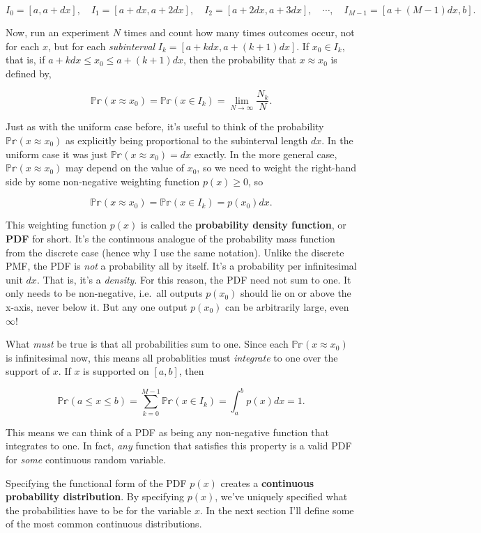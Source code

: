 \documentclass[
  letterpaper,
  DIV=11,
  numbers=noendperiod]{scrreprt}
\begin{document}
\[I_0=[a,a+dx], \quad I_1=[a+dx, a+2dx], \quad I_2=[a+2dx, a+3dx], \quad \cdots, \quad I_{M-1}=[a+(M-1)dx, b].\]

Now, run an experiment \(N\) times and count how many times outcomes
occur, not for each \(x\), but for each \emph{subinterval}
\(I_k=[a+kdx, a+(k+1)dx]\). If \(x_0 \in I_k\), that is, if
\(a+kdx \leq x_0 \leq a+(k+1)dx\), then the probability that
\(x \approx x_0\) is defined by,

\[\mathbb{Pr}(x \approx x_0) = \mathbb{Pr}(x \in I_k) = \lim_{N \rightarrow \infty} \frac{N_k}{N}.\]

Just as with the uniform case before, it's useful to think of the
probability \(\mathbb{Pr}(x \approx x_0)\) as explicitly being
proportional to the subinterval length \(dx\). In the uniform case it
was just \(\mathbb{Pr}(x \approx x_0)=dx\) exactly. In the more general
case, \(\mathbb{Pr}(x \approx x_0)\) may depend on the value of \(x_0\),
so we need to weight the right-hand side by some non-negative weighting
function \(p(x) \geq 0\), so

\[\mathbb{Pr}(x \approx  x_0) = \mathbb{Pr}(x \in I_k) = p(x_0)dx.\]

This weighting function \(p(x)\) is called the \textbf{probability
density function}, or \textbf{PDF} for short. It's the continuous
analogue of the probability mass function from the discrete case (hence
why I use the same notation). Unlike the discrete PMF, the PDF is
\emph{not} a probability all by itself. It's a probability per
infinitesimal unit \(dx\). That is, it's a \emph{density}. For this
reason, the PDF need not sum to one. It only needs to be non-negative,
i.e.~all outputs \(p(x_0)\) should lie on or above the x-axis, never
below it. But any one output \(p(x_0)\) can be arbitrarily large, even
\(\infty\)!

What \emph{must} be true is that all probabilities sum to one. Since
each \(\mathbb{Pr}(x \approx x_0)\) is infinitesimal now, this means all
probablities must \emph{integrate} to one over the support of \(x\). If
\(x\) is supported on \([a,b]\), then

\[\mathbb{Pr}(a \leq x \leq b) = \sum_{k=0}^{M-1} \mathbb{Pr}(x \in I_k) = \int_a^b p(x)dx = 1.\]

This means we can think of a PDF as being any non-negative function that
integrates to one. In fact, \emph{any} function that satisfies this
property is a valid PDF for \emph{some} continuous random variable.

Specifying the functional form of the PDF \(p(x)\) creates a
\textbf{continuous probability distribution}. By specifying \(p(x)\),
we've uniquely specified what the probabilities have to be for the
variable \(x\). In the next section I'll define some of the most common
continuous distributions.
\end{document}
